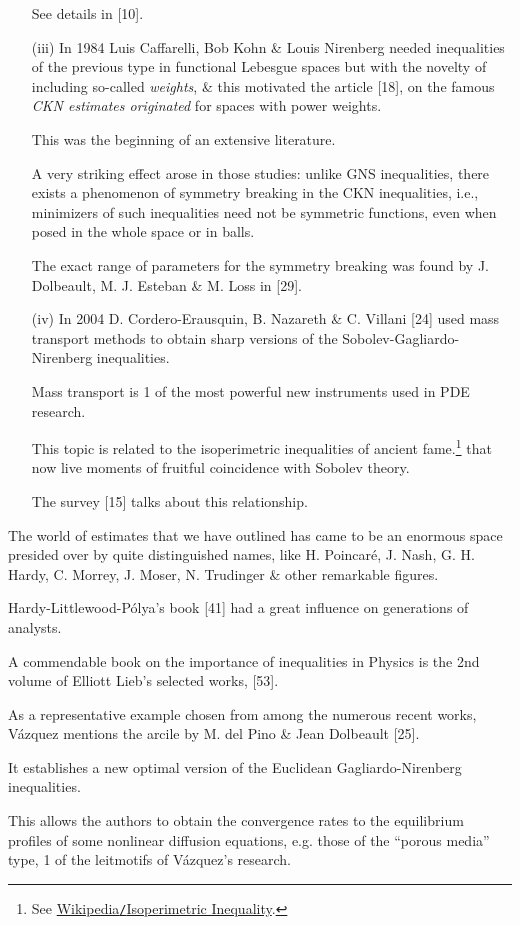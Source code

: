 \documentclass{article}
\begin{document}
\begin{itemize}
	See details in [10].
	\item[(iii)] In 1984 Luis Caffarelli, Bob Kohn \& Louis Nirenberg needed inequalities of the previous type in functional Lebesgue spaces but with the novelty of including so-called \textit{weights}, \& this motivated the article [18], on the famous \textit{CKN estimates originated} for spaces with power weights.
	
	This was the beginning of an extensive literature.
	
	A very striking effect arose in those studies: unlike GNS inequalities, there exists a phenomenon of symmetry breaking in the CKN inequalities, i.e., minimizers of such inequalities need not be symmetric functions, even when posed in the whole space or in balls.
	
	The exact range of parameters for the symmetry breaking was found by J. Dolbeault, M. J. Esteban \& M. Loss in [29].
	\item[(iv)] In 2004 D. Cordero-Erausquin, B. Nazareth \& C. Villani [24] used mass transport methods to obtain sharp versions of the Sobolev-Gagliardo-Nirenberg inequalities.
	
	Mass transport is 1 of the most powerful new instruments used in PDE research.
	
	This topic is related to the isoperimetric inequalities of ancient fame.\footnote{See \href{https://en.wikipedia.org/wiki/Isoperimetric-inequality}{Wikipedia{\tt/}Isoperimetric Inequality}.} that now live moments of fruitful coincidence with Sobolev theory.
	
	The survey [15] talks about this relationship.
\end{itemize}
The world of estimates that we have outlined has came to be an enormous space presided over by quite distinguished names, like H. Poincar\'e, J. Nash, G. H. Hardy, C. Morrey, J. Moser, N. Trudinger \& other remarkable figures.

Hardy-Littlewood-P\'olya's book [41] had a great influence on generations of analysts.

A commendable book on the importance of inequalities in Physics is the 2nd volume of Elliott Lieb's selected works, [53].

%
As a representative example chosen from among the numerous recent works, V\'azquez mentions the arcile by M. del Pino \& Jean Dolbeault [25].

It establishes a new optimal version of the Euclidean Gagliardo-Nirenberg inequalities.

This allows the authors to obtain the convergence rates to the equilibrium profiles of some nonlinear diffusion equations, e.g. those of the ``porous media'' type, 1 of the leitmotifs of V\'azquez's research.
\end{document}
